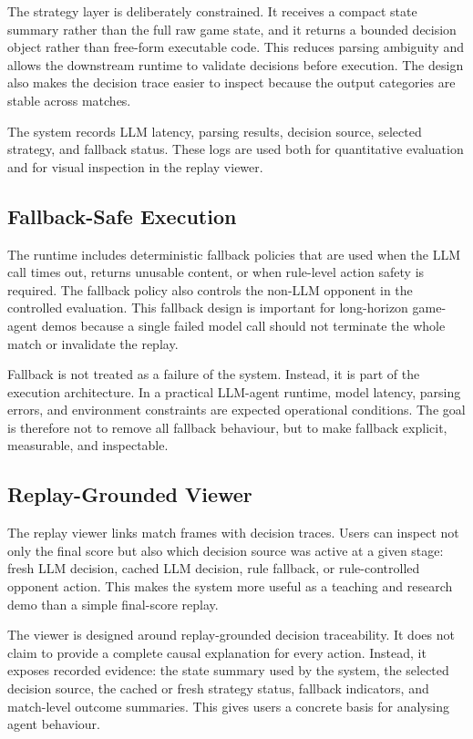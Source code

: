 \documentclass[11pt]{article}
\begin{document}
The strategy layer is deliberately constrained. It receives a compact state summary rather than the full raw game state, and it returns a bounded decision object rather than free-form executable code. This reduces parsing ambiguity and allows the downstream runtime to validate decisions before execution. The design also makes the decision trace easier to inspect because the output categories are stable across matches.

The system records LLM latency, parsing results, decision source, selected strategy, and fallback status. These logs are used both for quantitative evaluation and for visual inspection in the replay viewer.

\subsection{Fallback-Safe Execution}

The runtime includes deterministic fallback policies that are used when the LLM call times out, returns unusable content, or when rule-level action safety is required. The fallback policy also controls the non-LLM opponent in the controlled evaluation. This fallback design is important for long-horizon game-agent demos because a single failed model call should not terminate the whole match or invalidate the replay.

Fallback is not treated as a failure of the system. Instead, it is part of the execution architecture. In a practical LLM-agent runtime, model latency, parsing errors, and environment constraints are expected operational conditions. The goal is therefore not to remove all fallback behaviour, but to make fallback explicit, measurable, and inspectable.

\subsection{Replay-Grounded Viewer}

The replay viewer links match frames with decision traces. Users can inspect not only the final score but also which decision source was active at a given stage: fresh LLM decision, cached LLM decision, rule fallback, or rule-controlled opponent action. This makes the system more useful as a teaching and research demo than a simple final-score replay.

The viewer is designed around replay-grounded decision traceability. It does not claim to provide a complete causal explanation for every action. Instead, it exposes recorded evidence: the state summary used by the system, the selected decision source, the cached or fresh strategy status, fallback indicators, and match-level outcome summaries. This gives users a concrete basis for analysing agent behaviour.
\end{document}
